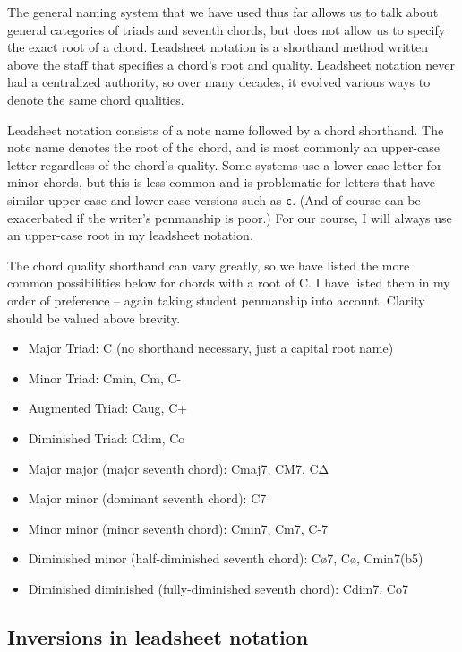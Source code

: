 \documentclass{book}
\begin{document}
The general naming system that we have used thus far allows us to talk about
general categories of triads and seventh chords, but does not allow us to
specify the exact root of a chord. Leadsheet notation is a shorthand method
written above the staff that specifies a chord's root and quality. Leadsheet
notation never had a centralized authority, so over many decades, it evolved
various ways to denote the same chord qualities.

Leadsheet notation consists of a note name followed by a chord shorthand. The
note name denotes the root of the chord, and is most commonly an upper-case
letter regardless of the chord's quality. Some systems use a lower-case letter
for minor chords, but this is less common and is problematic for letters that
have similar upper-case and lower-case versions such as \texttt{c}. (And of
course can be exacerbated if the writer's penmanship is poor.) For our course,
I will always use an upper-case root in my leadsheet notation.

The chord quality shorthand can vary greatly, so we have listed the more
common possibilities below for chords with a root of C. I have listed them in
my order of preference -- again taking student penmanship into account.
Clarity should be valued above brevity.

\begin{itemize}
\item
  Major Triad: C (no shorthand necessary, just a capital root name)
\item
  Minor Triad: Cmin, Cm, C-
\item
  Augmented Triad: Caug, C+
\item
  Diminished Triad: Cdim, Co
\item
  Major major (major seventh chord): Cmaj7, CM7, CΔ
\item
  Major minor (dominant seventh chord): C7
\item
  Minor minor (minor seventh chord): Cmin7, Cm7, C-7
\item
  Diminished minor (half-diminished seventh chord): Cø7, Cø, Cmin7(b5)
\item
  Diminished diminished (fully-diminished seventh chord): Cdim7, Co7
\end{itemize}

\hypertarget{inversions-in-leadsheet-notation}{%
\subsection{Inversions in leadsheet
notation}\label{inversions-in-leadsheet-notation}}
\end{document}
